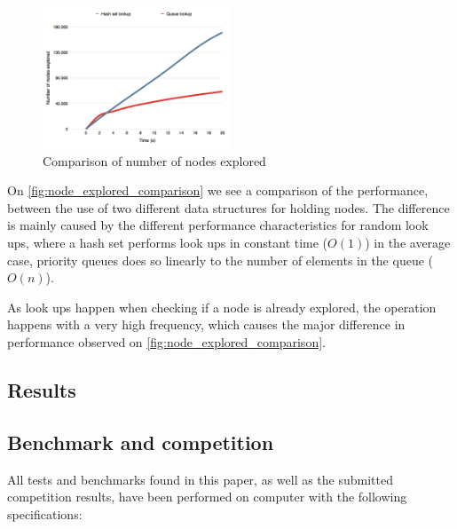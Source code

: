 \documentclass[Main]{subfiles}
\begin{document}
\begin{figure}[h!]
    \centering
    \includegraphics[width=0.5\textwidth]{nodes_explored_compare.png}
    \caption{Comparison of number of nodes explored}
    \label{fig:node_explored_comparison}
\end{figure}


On \autoref{fig:node_explored_comparison} we see a comparison of the performance, between the use of two different data structures for holding nodes. 
The difference is mainly caused by the different performance characteristics for random look ups, 
where a hash set performs look ups in constant time ($O(1)$) in the average case,
priority queues does so linearly to the number of elements in the queue ($O(n)$).

As look ups happen when checking if a node is already explored, the operation happens with a very high frequency, which causes the major difference in performance observed on \autoref{fig:node_explored_comparison}.




\subsection{Results}




\subsection{Benchmark and competition}

All tests and benchmarks found in this paper, as well as the submitted competition results, have been performed on computer with the following specifications:
\end{document}
